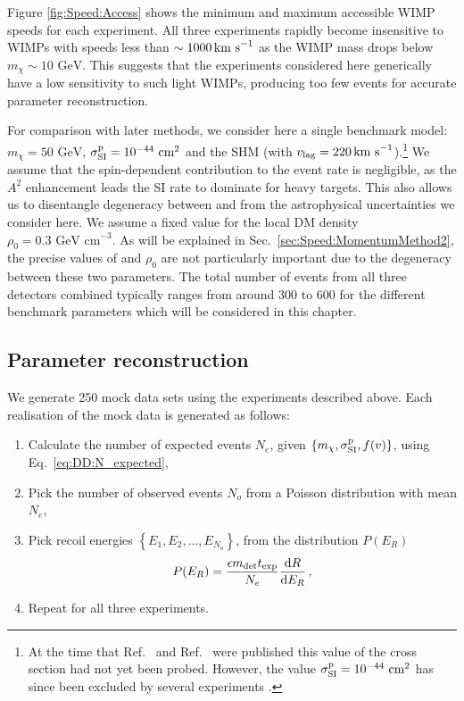 Figure \ref{fig:Speed:Access} shows the minimum and maximum accessible WIMP speeds for each experiment. All three experiments rapidly become insensitive to WIMPs with speeds less than \(\sim 1000 \,\textrm{km s}^{-1}\) as the WIMP mass drops below \(m_\chi \sim 10 \textrm{ GeV}\). This suggests that the experiments considered here generically have a low sensitivity to such light WIMPs, producing too few events for accurate parameter reconstruction.

For comparison with later methods, we consider here a single benchmark model: \(m_\chi = 50 \textrm{ GeV}\), $\sigmapsi = 10^{-44} \cmsq$ and the SHM (with $v_\textrm{lag} = 220 \,\textrm{km s}^{-1}$).\footnote{At the time that Ref.~\cite{Peter:2011} and Ref.~\cite{Kavanagh:2012} were published this value of the cross section had not yet been probed. However, the value $\sigmapsi = 10^{-44} \cmsq$ has since been excluded by several experiments \cite{Aprile:2012b,Akerib:2014}.} We assume that the spin-dependent contribution to the event rate is negligible, as the $A^2$ enhancement leads the SI rate to dominate for heavy targets. This also allows us to disentangle degeneracy between \sigmapsi and \sigmapsd from the astrophysical uncertainties we consider here. We assume a fixed value for the local DM density $\rho_0 = 0.3 \textrm{ GeV cm}^{-3}$. As will be explained in Sec.~\ref{sec:Speed:MomentumMethod2}, the precise values of \sigmapsi and \(\rho_0\) are not particularly important due to the degeneracy between these two parameters. The total number of events from all three detectors combined typically ranges from around 300 to 600 for the different benchmark parameters which will be considered in this chapter.

\subsection{Parameter reconstruction}
We generate 250 mock data sets using the experiments described above. Each realisation of the mock data is generated as follows:

\begin{enumerate}
\item Calculate the number of expected events $N_e$, given $\left\{m_\chi, \sigmapsi, f(v)\right\}$, using Eq.~\ref{eq:DD:N_expected},
\item Pick the number of observed events $N_o$ from a Poisson distribution with mean $N_e$,
\item Pick recoil energies $\left\{E_1, E_2, ..., E_{N_o}\right\}$, from the distribution $P(E_R)$
\begin{equation}
P(E_R) = \frac{\epsilon m_\textrm{det} t_\textrm{exp}}{N_e}\frac{\mathrm{d}R}{\mathrm{d}E_R}\,,
\end{equation}
\item Repeat for all three experiments.
\end{enumerate}

